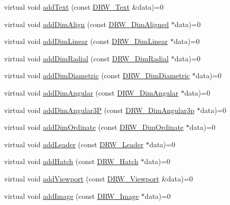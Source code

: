 \begin{DoxyCompactItemize}
\item 
virtual void \hyperlink{classDRW__Interface_a13be257d7e54629f3173fad53448c0a7}{add\-Text} (const \hyperlink{classDRW__Text}{D\-R\-W\-\_\-\-Text} \&data)=0
\item 
virtual void \hyperlink{classDRW__Interface_a6f351237a9d4f10c3f9651c68966a3fb}{add\-Dim\-Align} (const \hyperlink{classDRW__DimAligned}{D\-R\-W\-\_\-\-Dim\-Aligned} $\ast$data)=0
\item 
virtual void \hyperlink{classDRW__Interface_a81d63111186b65e662fd0fecfa09da2e}{add\-Dim\-Linear} (const \hyperlink{classDRW__DimLinear}{D\-R\-W\-\_\-\-Dim\-Linear} $\ast$data)=0
\item 
virtual void \hyperlink{classDRW__Interface_a50307476a7aa8065ee5462cd7fdce3c6}{add\-Dim\-Radial} (const \hyperlink{classDRW__DimRadial}{D\-R\-W\-\_\-\-Dim\-Radial} $\ast$data)=0
\item 
virtual void \hyperlink{classDRW__Interface_a63948977f0a34dd29697f0db7e24a6ed}{add\-Dim\-Diametric} (const \hyperlink{classDRW__DimDiametric}{D\-R\-W\-\_\-\-Dim\-Diametric} $\ast$data)=0
\item 
virtual void \hyperlink{classDRW__Interface_af53ce2878a9327464897aa1cb8e7a333}{add\-Dim\-Angular} (const \hyperlink{classDRW__DimAngular}{D\-R\-W\-\_\-\-Dim\-Angular} $\ast$data)=0
\item 
virtual void \hyperlink{classDRW__Interface_abdeea17ef54bd623e569f492943f1e9d}{add\-Dim\-Angular3\-P} (const \hyperlink{classDRW__DimAngular3p}{D\-R\-W\-\_\-\-Dim\-Angular3p} $\ast$data)=0
\item 
virtual void \hyperlink{classDRW__Interface_ab3e89843322248d2a0e87dedb9cb9aec}{add\-Dim\-Ordinate} (const \hyperlink{classDRW__DimOrdinate}{D\-R\-W\-\_\-\-Dim\-Ordinate} $\ast$data)=0
\item 
virtual void \hyperlink{classDRW__Interface_a10b2f081689b5a89e3cced928e60369a}{add\-Leader} (const \hyperlink{classDRW__Leader}{D\-R\-W\-\_\-\-Leader} $\ast$data)=0
\item 
virtual void \hyperlink{classDRW__Interface_a486e160f61c3e86e53bb8b801b9bbbab}{add\-Hatch} (const \hyperlink{classDRW__Hatch}{D\-R\-W\-\_\-\-Hatch} $\ast$data)=0
\item 
virtual void \hyperlink{classDRW__Interface_a6127b0330b671d2cb1be73478ff24945}{add\-Viewport} (const \hyperlink{classDRW__Viewport}{D\-R\-W\-\_\-\-Viewport} \&data)=0
\item 
virtual void \hyperlink{classDRW__Interface_a90f17ffeb31d7b41c0ff23eb396c60e2}{add\-Image} (const \hyperlink{classDRW__Image}{D\-R\-W\-\_\-\-Image} $\ast$data)=0

\end{DoxyCompactItemize}
